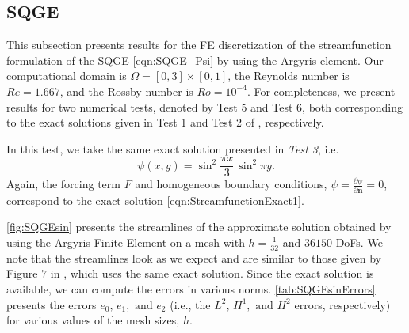 \subsection{SQGE}\label{sse:SQGE}
This subsection presents results for the FE discretization of the streamfunction
formulation of the SQGE \eqref{eqn:SQGE_Psi} by using the Argyris element. Our
computational domain is $\Omega=[0,3]\times[0,1]$, the Reynolds number is
$Re=1.667$, and the Rossby number is $Ro=10^{-4}$.  For completeness, we present
results for two numerical tests, denoted by Test 5 and Test 6, both
corresponding to the exact solutions given in Test 1 and Test 2 of
\cite{Cascon}, respectively.

In this test, we take the same exact solution presented in \emph{Test 3}, i.e.
\begin{equation}
  \psi(x,y) = \sin^2 \frac{\pi x}{3} \, \sin^2 \pi y.
  \label{eqn:StreamfunctionExact1}
\end{equation}
Again, the forcing term $F$ and homogeneous boundary conditions, $\psi = \frac{\partial
\psi}{\partial \mathbf{n}} = 0$, correspond to the exact solution \eqref{eqn:StreamfunctionExact1}.

\autoref{fig:SQGEsin} presents the streamlines of the approximate solution
obtained by using the Argyris Finite Element on a mesh with $h=\frac{1}{32}$ and
$36150$ DoFs. We note that the streamlines look as we expect and are similar to
those given by Figure $7$ in \cite{Myers}, which uses the same exact solution.
Since the exact solution is available, we can compute the errors in various
norms. \autoref{tab:SQGEsinErrors} presents the errors $e_0,\, e_1, \text{ and }
e_2$ (i.e., the $L^2,\, H^1, \text{ and } H^2$ errors, respectively) for various
values of the mesh sizes, $h$.

